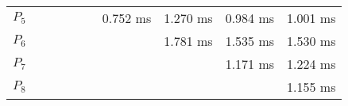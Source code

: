 \documentclass{beamer}
\begin{document}
\begin{frame}
{\begin{table}
\begin{tabular}{l|*{9}{c}}
$P_5$ &          &          &          &          &          & 0.752 ms & 1.270 ms & 0.984 ms & 1.001 ms \\
$P_6$ &          &          &          &          &          &          & 1.781 ms & 1.535 ms & 1.530 ms \\
$P_7$ &          &          &          &          &          &          &          & 1.171 ms & 1.224 ms \\
$P_8$ &          &          &          &          &          &          &          &          & 1.155 ms \\
\end{tabular}
\end{table}
}
\end{frame}

\begin{frame}
\end{frame}

\begin{frame}[shrink]
\begin{figure}

\end{figure}
\end{frame}

\begin{frame}
\end{frame}
\end{document}
